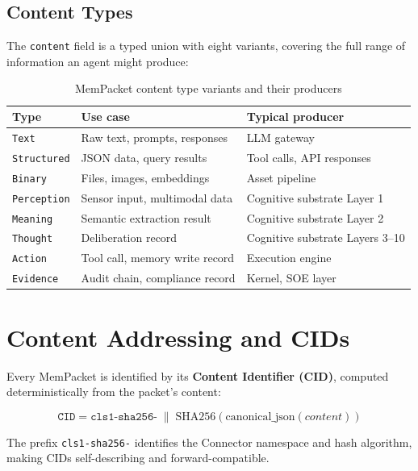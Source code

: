 \subsection{Content Types}

The \texttt{content} field is a typed union with eight variants, covering the
full range of information an agent might produce:

\begin{table}[H]
\centering
\renewcommand{\arraystretch}{1.35}
\begin{tabularx}{\textwidth}{@{}llX@{}}
\toprule
\textbf{Type} & \textbf{Use case} & \textbf{Typical producer} \\
\midrule
\texttt{Text}        & Raw text, prompts, responses      & LLM gateway \\
\texttt{Structured}  & JSON data, query results          & Tool calls, API responses \\
\texttt{Binary}      & Files, images, embeddings         & Asset pipeline \\
\texttt{Perception}  & Sensor input, multimodal data     & Cognitive substrate Layer 1 \\
\texttt{Meaning}     & Semantic extraction result        & Cognitive substrate Layer 2 \\
\texttt{Thought}     & Deliberation record               & Cognitive substrate Layers 3--10 \\
\texttt{Action}      & Tool call, memory write record    & Execution engine \\
\texttt{Evidence}    & Audit chain, compliance record    & Kernel, SOE layer \\
\bottomrule
\end{tabularx}
\caption{MemPacket content type variants and their producers}
\end{table}

\section{Content Addressing and CIDs}

Every MemPacket is identified by its \textbf{Content Identifier (CID)}, computed
deterministically from the packet's content:

\[
\texttt{CID} = \texttt{cls1-sha256-} \;\|\; \text{SHA256}\!\left(\text{canonical\_json}(\textit{content})\right)
\]

The prefix \texttt{cls1-sha256-} identifies the Connector namespace and hash
algorithm, making CIDs self-describing and forward-compatible.

